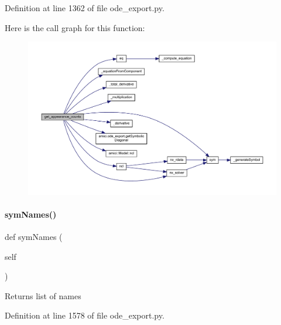 Definition at line 1362 of file ode\+\_\+export.\+py.

Here is the call graph for this function\+:
\nopagebreak
\begin{figure}[H]
\begin{center}
\leavevmode
\includegraphics[width=350pt]{classamici_1_1ode__export_1_1_o_d_e_model_a5e124f15318e0b6217db8290b3bbe3b4_cgraph}
\end{center}
\end{figure}
\mbox{\label{classamici_1_1ode__export_1_1_o_d_e_model_a2223bbe62f3234b8f40c5a566064a481}} 
\paragraph{\texorpdfstring{symNames()}{symNames()}}
{\footnotesize\ttfamily def sym\+Names (\begin{DoxyParamCaption}\item[{}]{self }\end{DoxyParamCaption})}

\begin{DoxyReturn}{Returns}
list of names 
\end{DoxyReturn}


Definition at line 1578 of file ode\+\_\+export.\+py.

